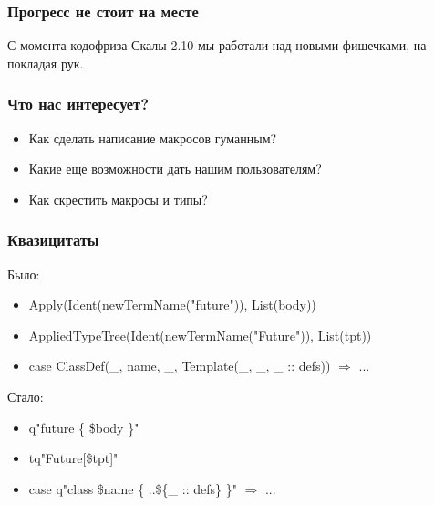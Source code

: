 \documentclass[svgnames,hyperref={bookmarks=false}]{beamer}
\begin{document}
\begin{frame}[fragile]
\frametitle{}

\vskip40pt
\begin{center}
\end{center}
\end{frame}

\begin{frame}[fragile]
\frametitle{Прогресс не стоит на месте}
С момента кодофриза Скалы 2.10 мы работали над новыми фишечками, на покладая рук.
\end{frame}

\begin{frame}[fragile]
\frametitle{Что нас интересует?}
\begin{itemize}
\item Как сделать написание макросов гуманным?
\item Какие еще возможности дать нашим пользователям?
\item Как скрестить макросы и типы?
\end{itemize}
\end{frame}

\begin{frame}[fragile]
\frametitle{Квазицитаты}

Было:
\begin{itemize}
\item Apply(Ident(newTermName("future")), List(body))
\item AppliedTypeTree(Ident(newTermName("Future")), List(tpt))
\item case ClassDef(\_, name, \_, Template(\_, \_, \_ :: defs)) $\Rightarrow$ ...
\end{itemize}

\vskip25pt
Стало:
\begin{itemize}
\item q"future \{ \$body \}"
\item tq"Future[\$tpt]"
\item case q"class \$name \{ ..\$\{\_ :: defs\} \}" $\Rightarrow$ ...
\end{itemize}
\end{frame}
\end{document}
